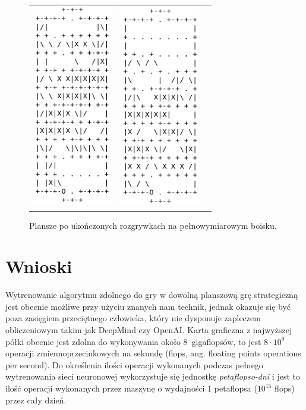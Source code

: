 \documentclass[licencjacka]{pracamgr}
\begin{document}
\begin{figure}
\begin{tabular}{cccc}
\end{tabular}
\begin{tabular}{ccc}
  \includegraphics[width=35mm]{standard3} & \includegraphics[width=35mm]{standard4} \\
\end{tabular}
\caption{Plansze po ukończonych rozgrywkach na pełnowymiarowym boisku.}
\end{figure}

\chapter{Wnioski}

Wytrenowanie algorytmu zdolnego do gry w dowolną planszową grę strategiczną jest obecnie możliwe przy użyciu znanych nam technik, jednak okazuje się być poza zasięgiem przeciętnego człowieka, który nie dysponuje zapleczem obliczeniowym takim jak DeepMind czy OpenAI. Karta graficzna z najwyższej półki obecnie jest zdolna do wykonywania około 8~gigaflopsów, to jest $8 \cdot 10^9$ operacji zmiennoprzecinkowych na sekundę (flops, ang. floating points operations per second). Do określenia ilości operacji wykonanych podczas pełnego wytrenowania sieci neuronowej wykorzystuje się jednostkę \emph{petaflopso-dni} i jest to ilość operacji wykonanych przez maszynę o wydajności 1 petaflopsa ($10^{15}$ flops) przez cały dzień. 
\end{document}

